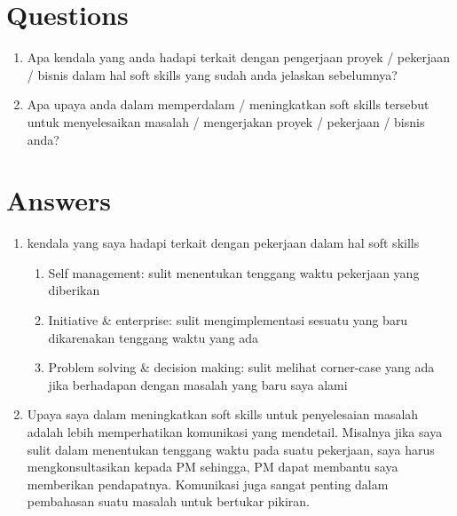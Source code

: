 \documentclass[12pt, letterpaper]{article}
\begin{document}
\section*{Questions}
\begin{enumerate}
    \item Apa kendala yang anda hadapi terkait dengan pengerjaan proyek / pekerjaan / bisnis dalam hal soft skills yang sudah anda jelaskan sebelumnya?
    \item Apa upaya anda dalam memperdalam / meningkatkan soft skills tersebut untuk menyelesaikan masalah / mengerjakan proyek / pekerjaan / bisnis anda?
\end{enumerate}

\section*{Answers}
\begin{enumerate}
    \item kendala yang saya hadapi terkait dengan pekerjaan dalam hal soft skills
        \begin{enumerate}
            \item Self management: sulit menentukan tenggang waktu pekerjaan yang diberikan
            \item Initiative \& enterprise: sulit mengimplementasi sesuatu yang baru dikarenakan tenggang waktu yang ada
            \item Problem solving \& decision making: sulit melihat corner-case yang ada jika berhadapan dengan masalah yang baru saya alami
        \end{enumerate}
    \item Upaya saya dalam meningkatkan soft skills untuk penyelesaian masalah adalah lebih memperhatikan komunikasi yang mendetail.
    Misalnya jika saya sulit dalam menentukan tenggang waktu pada suatu pekerjaan, saya harus mengkonsultasikan kepada PM sehingga, PM dapat membantu saya memberikan pendapatnya.
    Komunikasi juga sangat penting dalam pembahasan suatu masalah untuk bertukar pikiran.
\end{enumerate}
\end{document}
